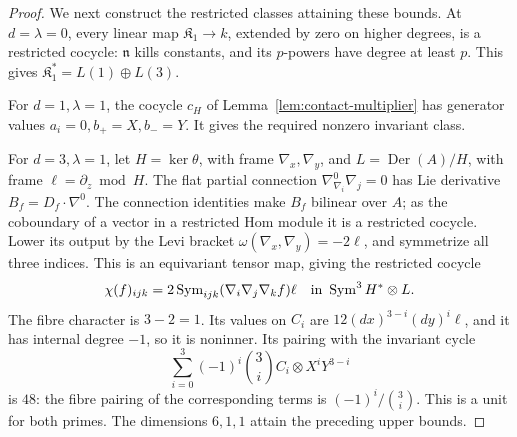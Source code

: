 \documentclass[11pt]{article}
\theoremstyle{plain}
\theoremstyle{definition}
\theoremstyle{remark}
\numberwithin{equation}{section}
\newcommand{\kk}{k}
\newcommand{\Kalg}{\mathfrak K}
\begin{document}
\begin{proof}
We next construct the restricted classes attaining these bounds.
At \(d=\lambda=0\), every linear map \(\Kalg_1\to\kk\),
extended by zero on higher degrees, is a restricted cocycle:
\(\mathfrak n\) kills constants, and its \(p\)-powers have
degree at least \(p\). This gives \(\Kalg_1^*=L(1)\oplus L(3)\).

For \(d=1,\lambda=1\), the cocycle \(c_H\) of
Lemma~\ref{lem:contact-multiplier} has generator values
\(a_i=0,b_+=X,b_-=Y\). It gives the required nonzero invariant class.

For \(d=3,\lambda=1\), let
\(H=\ker\theta\), with frame \(\nabla_x,\nabla_y\),
and \(L=\operatorname{Der}(A)/H\), with frame
\(\ell=\partial_z\bmod H\).
The flat partial connection
\(\nabla^0_{\nabla_i}\nabla_j=0\) has Lie derivative
\(B_f=D_f\cdot\nabla^0\).
The connection identities make \(B_f\) bilinear over \(A\);
as the coboundary of a vector in a restricted Hom module it is
a restricted cocycle.
Lower its output by the Levi bracket
\(\omega(\nabla_x,\nabla_y)=-2\ell\), and symmetrize all three
indices. This is an equivariant tensor map, giving the restricted
cocycle
\[
 \chi(f)_{ijk}
       =2\operatorname{Sym}_{ijk}(\nabla_i\nabla_j\nabla_k f)\ell
       \quad\hbox{in }\operatorname{Sym}^3H^*\otimes L .
\]
The fibre character is \(3-2=1\).
Its values on \(C_i\) are \(12(dx)^{3-i}(dy)^i\ell\),
and it has internal degree \(-1\), so it is noninner.
Its pairing with the invariant cycle
\[
 \sum_{i=0}^3(-1)^i\binom3i C_i\otimes X^iY^{3-i}
\]
is \(48\): the fibre pairing of the corresponding terms is
\((-1)^i/\binom3i\). This is a unit for both primes.
The dimensions \(6,1,1\) attain the preceding upper bounds.
\end{proof}
\end{document}
